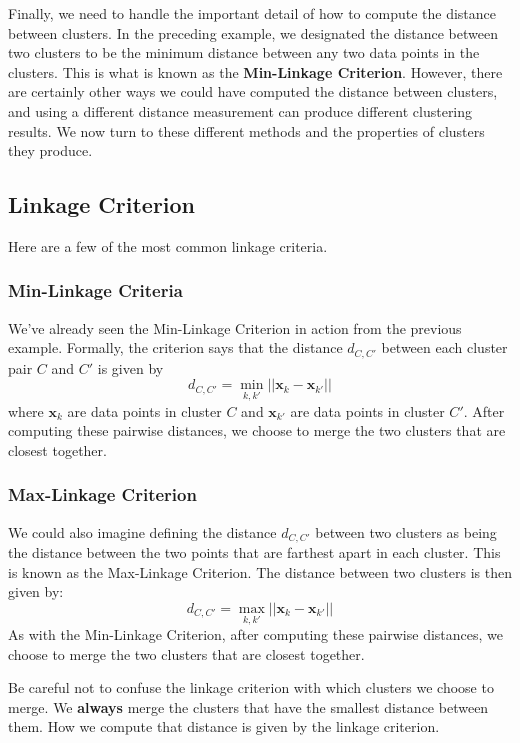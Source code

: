 Finally, we need to handle the important detail of how to compute the distance between clusters. In the preceding example, we designated the distance between two clusters to be the minimum distance between any two data points in the clusters. This is what is known as the \textbf{Min-Linkage Criterion}. However, there are certainly other ways we could have computed the distance between clusters, and using a different distance measurement can produce different clustering results. We now turn to these different methods and the properties of clusters they produce.

\subsection{Linkage Criterion}
Here are a few of the most common linkage criteria.

\subsubsection{Min-Linkage Criteria}
We've already seen the Min-Linkage Criterion in action from the previous example. Formally, the criterion says that the distance $d_{C, C'}$ between each cluster pair $C$ and $C'$ is given by
\begin{equation} \label{min-linkage-crit}
	d_{C, C'} = \underset{k, k'}{\min} || \textbf{x}_{k} - \textbf{x}_{k'} ||
\end{equation}
where $\textbf{x}_{k}$ are data points in cluster $C$ and $\textbf{x}_{k'}$ are data points in cluster $C'$. After computing these pairwise distances, we choose to merge the two clusters that are closest together.

\subsubsection{Max-Linkage Criterion}
We could also imagine defining the distance $d_{C, C'}$ between two clusters as being the distance between the two points that are farthest apart in each cluster. This is known as the Max-Linkage Criterion. The distance between two clusters is then given by:
\begin{equation} \label{max-linkage-crit}
	d_{C, C'} = \underset{k, k'}{\max} || \textbf{x}_{k} - \textbf{x}_{k'} ||
\end{equation}
As with the Min-Linkage Criterion, after computing these pairwise distances, we choose to merge the two clusters that are closest together.

\begin{warning}
    Be careful not to confuse the linkage criterion with which clusters we choose to merge. We \textbf{always} merge the clusters that have the smallest distance between them. How we compute that distance is given by the linkage criterion.
\end{warning}

